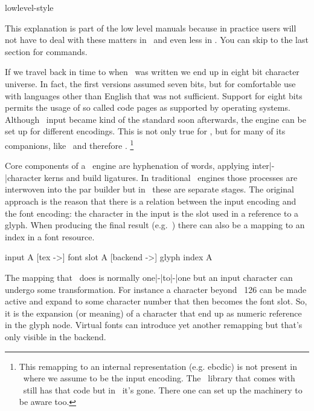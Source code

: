 
\environment lowlevel-style

\startdocument
  [title=characters,
   color=middlered]

\startsection[title=Introduction]

This explanation is part of the low level manuals because in practice users will
not have to deal with these matters in \MKIV\ and even less in \LMTX. You can
skip to the last section for commands.

\stopsection

\startsection[title=History]

If we travel back in time to when \TEX\ was written we end up in eight bit
character universe. In fact, the first versions assumed seven bits, but for
comfortable use with languages other than English that was not sufficient.
Support for eight bits permits the usage of so called code pages as supported by
operating systems. Although \ASCII\ input became kind of the standard soon
afterwards, the engine can be set up for different encodings. This is not only
true for \TEX, but for many of its companions, like \METAFONT\ and therefore
\METAPOST. \footnote {This remapping to an internal representation (e.g. ebcdic)
is not present in \LUATEX\ where we assume  to be the input encoding. The
\METAPOST\ library that comes with \LUATEX\ still has that code but in
\LUAMETATEX\ it's gone. There one can set up the machinery to be  aware
too.}

Core components of a \TEX\ engine are hyphenation of words, applying
inter|-|character kerns and build ligatures. In traditional \TEX\ engines those
processes are interwoven into the par builder but in \LUATEX\ these are separate
stages. The original approach is the reason that there is a relation between the
input encoding and the font encoding: the character in the input is the slot used
in a reference to a glyph. When producing the final result (e.g.\ \PDF) there can
also be a mapping to an index in a font resource.

\starttyping
input A [tex ->] font slot A [backend ->] glyph index A
\stoptyping

The mapping that \TEX\ does is normally one|-|to|-|one but an input character can
undergo some transformation. For instance a character beyond \ASCII\ 126 can be
made active and expand to some character number that then becomes the font slot.
So, it is the expansion (or meaning) of a character that end up as numeric
reference in the glyph node. Virtual fonts can introduce yet another remapping
but that's only visible in the backend.

